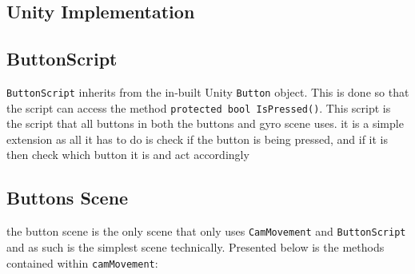 \subsection{Unity Implementation}
\subsection{ButtonScript}
{\tt ButtonScript} inherits from the in-built Unity {\tt Button} object. This is done so that the script can access the method {\tt   protected bool IsPressed()}. This script is the script that all buttons in both the buttons and gyro scene uses. it is a simple extension as all it has to do is check if the button is being pressed, and if it is then check which button it is and act accordingly
\subsection{Buttons Scene}
the button scene is the only scene that only uses  {\tt CamMovement} and {\tt ButtonScript} and as such is the simplest scene technically. Presented below is  the methods contained within {\tt camMovement}: 
